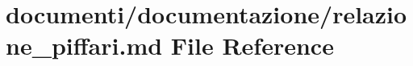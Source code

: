 \hypertarget{relazione__piffari_8md}{}\section{documenti/documentazione/relazione\+\_\+piffari.md File Reference}
\label{relazione__piffari_8md}
